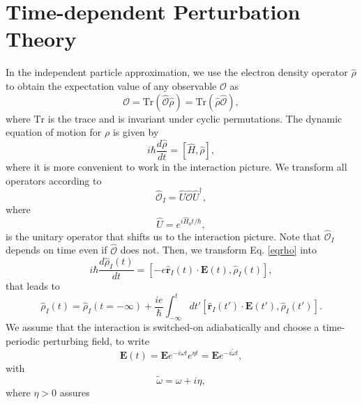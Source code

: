 \section{Time-dependent Perturbation Theory}\label{tdpt}

In the independent particle approximation, we use the electron density operator
$\hat{\rho}$ to obtain the expectation value of any observable $\mathcal{O}$ as
\begin{equation}\label{traza}
\mathcal{O}=\mathrm{Tr}(\hat{\mathcal{O}}\hat{\rho})=\mathrm{Tr}(\hat{\rho}\hat{\mathcal{O}}),
\end{equation}
where $\mathrm{Tr}$ is the trace and is invariant under cyclic permutations.
The dynamic equation of motion for $\rho$ is given by
\begin{equation}\label{eqrho}
i\hbar \frac{d\hat{\rho}}{dt}=[\hat{H},\hat{\rho}]
,
\end{equation}
where it is more convenient to work in the interaction picture. We transform 
all operators according to 
\begin{equation}\label{ip}
\hat{\mathcal{O}}_I=\hat{U}\hat{\mathcal{O}}\hat{U}^\dagger,
\end{equation}
where
\begin{equation}\label{ou}
\hat{U}=e^{i\hat{H}_0t/\hbar},
\end{equation}
is the unitary operator that shifts us to the interaction picture.
Note that $\hat{\mathcal{O}}_I$ depends on time even if $\hat{\mathcal{O}}$ does not.
Then, we transform Eq. \eqref{eqrho} into
\begin{equation}\label{intrho}
i\hbar\frac{d\hat{\rho}_I(t)}{dt}=[-e\hat{\mathbf{r}}_I(t)\cdot\mathbf{E}(t),\hat{\rho}_I(t)],
\end{equation}
that leads to
\begin{equation}\label{intrho2}
\hat{\rho}_I(t)=\hat{\rho}_I(t=-\infty)
+
\frac{ie}{\hbar}\int_{-\infty}^t dt'[\hat{\mathbf{r}}_I(t')\cdot\mathbf{E}(t'),\hat{\rho}_I(t')].
\end{equation}
We assume that the interaction is switched-on adiabatically and
choose a time-periodic perturbing field, to write
\begin{equation}\label{efield}
\mathbf{E}(t)=\mathbf{E} e^{-i\omega t}e^{\eta t}=\mathbf{E} e^{-i\tilde{\omega} t}
,
\end{equation}
with
\begin{equation}\label{got}
\tilde{\omega}=\omega+i\eta
,
\end{equation} 
where $\eta > 0$ assures
